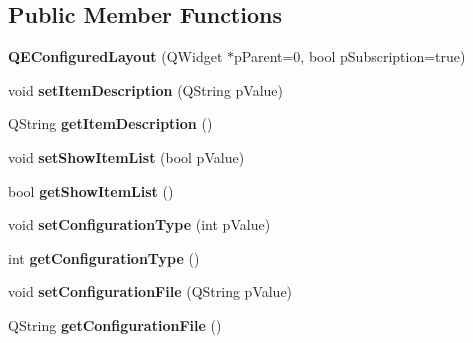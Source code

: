 \subsection*{Public Member Functions}
\begin{DoxyCompactItemize}
\item 
\hypertarget{classQEConfiguredLayout_a4620bc6b146873adb9f6ff5d07b8aaef}{
{\bfseries QEConfiguredLayout} (QWidget $\ast$pParent=0, bool pSubscription=true)}
\label{classQEConfiguredLayout_a4620bc6b146873adb9f6ff5d07b8aaef}

\item 
\hypertarget{classQEConfiguredLayout_a5f173dd23bb68a3225422d1b37eb2821}{
void {\bfseries setItemDescription} (QString pValue)}
\label{classQEConfiguredLayout_a5f173dd23bb68a3225422d1b37eb2821}

\item 
\hypertarget{classQEConfiguredLayout_a5c29ffc2928cf0453590cc8d9dca3f2f}{
QString {\bfseries getItemDescription} ()}
\label{classQEConfiguredLayout_a5c29ffc2928cf0453590cc8d9dca3f2f}

\item 
\hypertarget{classQEConfiguredLayout_aa2f5f0cb6c1f1d994229f73ff589bc6e}{
void {\bfseries setShowItemList} (bool pValue)}
\label{classQEConfiguredLayout_aa2f5f0cb6c1f1d994229f73ff589bc6e}

\item 
\hypertarget{classQEConfiguredLayout_a2a0a0edec36de21869b89a3ffdcbec8c}{
bool {\bfseries getShowItemList} ()}
\label{classQEConfiguredLayout_a2a0a0edec36de21869b89a3ffdcbec8c}

\item 
\hypertarget{classQEConfiguredLayout_ada06a40c35674b190975752252c8458f}{
void {\bfseries setConfigurationType} (int pValue)}
\label{classQEConfiguredLayout_ada06a40c35674b190975752252c8458f}

\item 
\hypertarget{classQEConfiguredLayout_a401e6bee5058fbebaafd2fb60aa3701a}{
int {\bfseries getConfigurationType} ()}
\label{classQEConfiguredLayout_a401e6bee5058fbebaafd2fb60aa3701a}

\item 
\hypertarget{classQEConfiguredLayout_abdcfc483fa8b78ee4d7e09dcffb75c55}{
void {\bfseries setConfigurationFile} (QString pValue)}
\label{classQEConfiguredLayout_abdcfc483fa8b78ee4d7e09dcffb75c55}

\item 
\hypertarget{classQEConfiguredLayout_a0f7198f933812f41cd742763f5a46a08}{
QString {\bfseries getConfigurationFile} ()}
\label{classQEConfiguredLayout_a0f7198f933812f41cd742763f5a46a08}


\end{DoxyCompactItemize}
